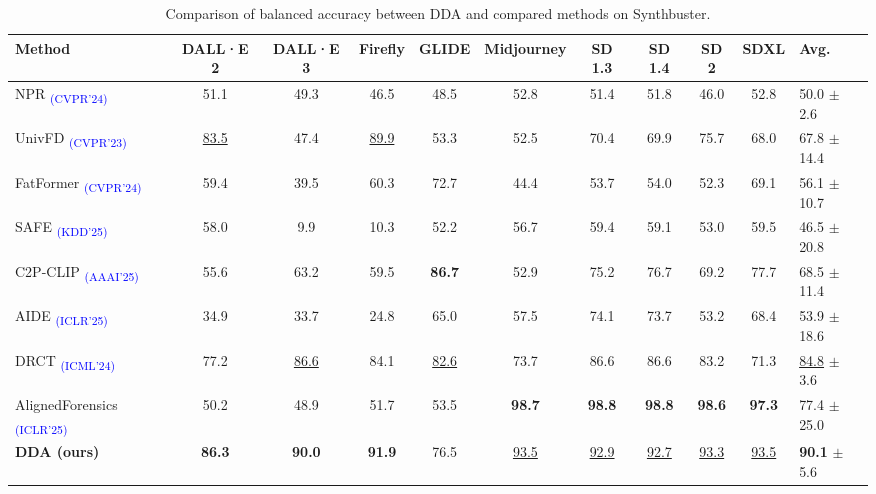 \documentclass{article}
\begin{document}
\begin{table}[tb!]
\centering
\caption{Comparison of balanced accuracy between DDA and compared methods on Synthbuster.}
\label{tab:compare-synthbuster}
\begin{adjustbox}{width=\linewidth}
\begin{tabular}{lcccccccccl}
\toprule
Method & DALL·E 2 & DALL·E 3 & Firefly & GLIDE & Midjourney & SD 1.3 & SD 1.4 & SD 2 & SDXL & Avg. \\
\midrule
NPR \textsubscript{\textcolor{blue}{(CVPR'24)}} \cite{cozzolino2024zero} & 51.1 & 49.3 & 46.5 & 48.5 & 52.8 & 51.4 & 51.8 & 46.0 & 52.8 & 50.0 $\pm$ 2.6 \\
UnivFD \textsubscript{\textcolor{blue}{(CVPR'23)}} \cite{ojha2023towards} & \underline{83.5} & 47.4 & \underline{89.9} & 53.3 & 52.5 & 70.4 & 69.9 & 75.7 & 68.0 & 67.8 $\pm$ 14.4 \\
FatFormer \textsubscript{\textcolor{blue}{(CVPR'24)}} \cite{liu2024forgery} & 59.4 & 39.5 & 60.3 & 72.7 & 44.4 & 53.7 & 54.0 & 52.3 & 69.1 & 56.1 $\pm$ 10.7 \\
SAFE \textsubscript{\textcolor{blue}{(KDD'25)}} \cite{li2024improving} & 58.0 & 9.9 & 10.3 & 52.2 & 56.7 & 59.4 & 59.1 & 53.0 & 59.5 & 46.5 $\pm$ 20.8 \\
C2P-CLIP \textsubscript{\textcolor{blue}{(AAAI'25)}} \cite{tan2024c2p} & 55.6 & 63.2 & 59.5 & \textbf{86.7} & 52.9 & 75.2 & 76.7 & 69.2 & 77.7 & 68.5 $\pm$ 11.4 \\
AIDE \textsubscript{\textcolor{blue}{(ICLR'25)}} \cite{yan2024sanity} & 34.9 & 33.7 & 24.8 & 65.0 & 57.5 & 74.1 & 73.7 & 53.2 & 68.4 & 53.9 $\pm$ 18.6 \\
DRCT \textsubscript{\textcolor{blue}{(ICML'24)}} \cite{chen2024drct} & 77.2 & \underline{86.6} & 84.1 & \underline{82.6} & 73.7 & 86.6 & 86.6 & 83.2 & 71.3 & \underline{84.8} $\pm$ 3.6 \\
AlignedForensics \textsubscript{\textcolor{blue}{(ICLR'25)}} \cite{rajan2025aligned} & 50.2 & 48.9 & 51.7 & 53.5 & \textbf{98.7} & \textbf{98.8} & \textbf{98.8} & \textbf{98.6} & \textbf{97.3} & 77.4 $\pm$ 25.0 \\
\midrule
\rowcolor{myblue}
\textbf{DDA (ours)} & \textbf{86.3} & \textbf{90.0} & \textbf{91.9} & 76.5 & \underline{93.5} & \underline{92.9} & \underline{92.7} & \underline{93.3} & \underline{93.5} & \textbf{90.1} $\pm$ 5.6 \\ 
\bottomrule
\end{tabular}
\end{adjustbox}
\vspace{0pt}
\end{table}
\end{document}
